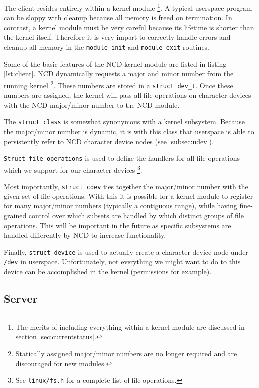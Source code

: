 \documentclass[11pt,twocolumn]{article}
\begin{document}


The client resides entirely within a kernel module \footnote{The merits
of including everything within a kernel module are discussed in section
\ref{sec:currentstatus}.}. A typical userspace program can be sloppy
with cleanup because all memory is freed on termination. In contrast, a
kernel module must be very careful because its lifetime is shorter than
the kernel itself. Therefore it is very import to correctly handle
errors and cleanup all memory in the \texttt{module\_init} and
\texttt{module\_exit} routines.

Some of the basic features of the NCD kernel module are listed in
listing \ref{lst:client}. NCD dynamically requests a major and
minor number from the running kernel \footnote{Statically assigned
major/minor numbers are no longer required and are discouraged for new
modules.}. These numbers are stored in a \texttt{struct dev\_t}. Once
these numbers are assigned, the kernel will pass all file operations on
character devices with the NCD major/minor number to the NCD module.

The \texttt{struct class} is somewhat synonymous with a kernel
subsystem. Because the major/minor number is dynamic, it is with this
class that userspace is able to persistently refer to NCD character
device nodes (see \ref{subsec:udev}).

\texttt{Struct file\_operations} is used to define the handlers for all
file operations which we support for our character devices \footnote{See
\texttt{linux/fs.h} for a complete list of file operations.}.

Most importantly, \texttt{struct cdev} ties together the major/minor
number with the given set of file operations. With this it is possible
for a kernel module to register for many major/minor numbers (typically
a contiguous range), while having fine-grained control over which
subsets are handled by which distinct groups of file operations. This
will be important in the future as specific subsystems are handled
differently by NCD to increase functionality.

Finally, \texttt{struct device} is used to actually create a character
device node under \texttt{/dev} in userspace. Unfortunately, not
everything we might want to do to this device can be accomplished in the
kernel (permissions for example).

\subsection{Server}
\end{document}
